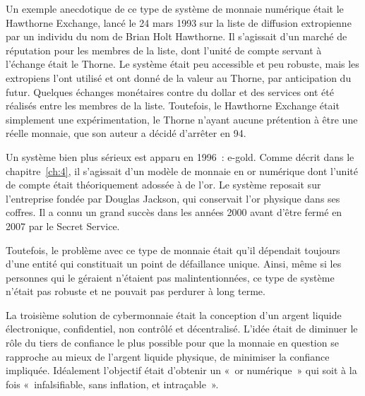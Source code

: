 Un exemple anecdotique de ce type de système de monnaie numérique était le Hawthorne Exchange, lancé le 24 mars 1993 sur la liste de diffusion extropienne par un individu du nom de Brian Holt Hawthorne. Il s'agissait d'un marché de réputation pour les membres de la liste, dont l'unité de compte servant à l'échange était le Thorne. Le système était peu accessible et peu robuste, mais les extropiens l'ont utilisé et ont donné de la valeur au Thorne, par anticipation du futur. Quelques échanges monétaires contre du dollar et des services ont été réalisés entre les membres de la liste. Toutefois, le Hawthorne Exchange était simplement une expérimentation, le Thorne n'ayant aucune prétention à être une réelle monnaie, que son auteur a décidé d'arrêter en 94. %

Un système bien plus sérieux est apparu en 1996~: e-gold. Comme décrit dans le chapitre~\ref{ch:4}, il s'agissait d'un modèle de monnaie en or numérique dont l'unité de compte était théoriquement adossée à de l'or. Le système reposait sur l'entreprise  fondée par Douglas Jackson, qui conservait l'or physique dans ses coffres. Il a connu un grand succès dans les années 2000 avant d'être fermé en 2007 par le Secret Service.

Toutefois, le problème avec ce type de monnaie était qu'il dépendait toujours d'une entité qui constituait un point de défaillance unique. Ainsi, même si les personnes qui le géraient n'étaient pas malintentionnées, ce type de système n'était pas robuste et ne pouvait pas perdurer à long terme.


La troisième solution de cybermonnaie était la conception d'un argent liquide électronique, confidentiel, non contrôlé et décentralisé. L'idée était de diminuer le rôle du tiers de confiance le plus possible pour que la monnaie en question se rapproche au mieux de l'argent liquide physique, de minimiser la confiance impliquée. Idéalement l'objectif était d'obtenir un «~or numérique~» qui soit à la fois «~infalsifiable, sans inflation, et intraçable~». %

